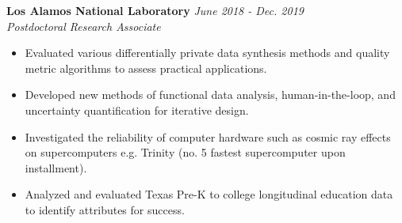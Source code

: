 \documentclass[12, letterpaper, roman]{moderncv} %
\newcommand{\workspace}{\vspace{3pt}}
\begin{document}
\workspace 

\textbf{Los Alamos National Laboratory} \hfill \textit{June 2018 - Dec. 2019}\\
\textit{Postdoctoral Research Associate}
\begin{itemize}
        \item Evaluated various differentially private data synthesis methods and quality metric algorithms to assess practical applications.
        \item Developed new methods of functional data analysis, human-in-the-loop, and uncertainty quantification for iterative design.
        \item Investigated the reliability of computer hardware such as cosmic ray effects on supercomputers e.g. Trinity (no. 5 fastest supercomputer upon installment).
        \item Analyzed and evaluated Texas Pre-K to college longitudinal education data to identify attributes for success.
\end{itemize}


\end{document}
